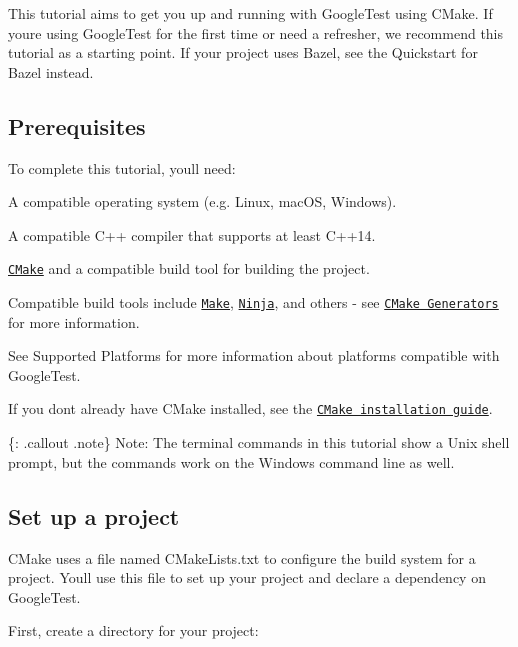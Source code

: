 This tutorial aims to get you up and running with Google\+Test using C\+Make. If you\textquotesingle{}re using Google\+Test for the first time or need a refresher, we recommend this tutorial as a starting point. If your project uses Bazel, see the Quickstart for Bazel instead.

\subsection*{Prerequisites}

To complete this tutorial, you\textquotesingle{}ll need\+:


\begin{DoxyItemize}
\item A compatible operating system (e.\+g. Linux, mac\+OS, Windows).
\item A compatible C++ compiler that supports at least C++14.
\item \href{https://cmake.org/}{\tt C\+Make} and a compatible build tool for building the project.
\begin{DoxyItemize}
\item Compatible build tools include \href{https://www.gnu.org/software/make/}{\tt Make}, \href{https://ninja-build.org/}{\tt Ninja}, and others -\/ see \href{https://cmake.org/cmake/help/latest/manual/cmake-generators.7.html}{\tt C\+Make Generators} for more information.
\end{DoxyItemize}
\end{DoxyItemize}

See Supported Platforms for more information about platforms compatible with Google\+Test.

If you don\textquotesingle{}t already have C\+Make installed, see the \href{https://cmake.org/install}{\tt C\+Make installation guide}.

\{\+: .callout .note\} Note\+: The terminal commands in this tutorial show a Unix shell prompt, but the commands work on the Windows command line as well.

\subsection*{Set up a project}

C\+Make uses a file named {\ttfamily C\+Make\+Lists.\+txt} to configure the build system for a project. You\textquotesingle{}ll use this file to set up your project and declare a dependency on Google\+Test.

First, create a directory for your project\+:



